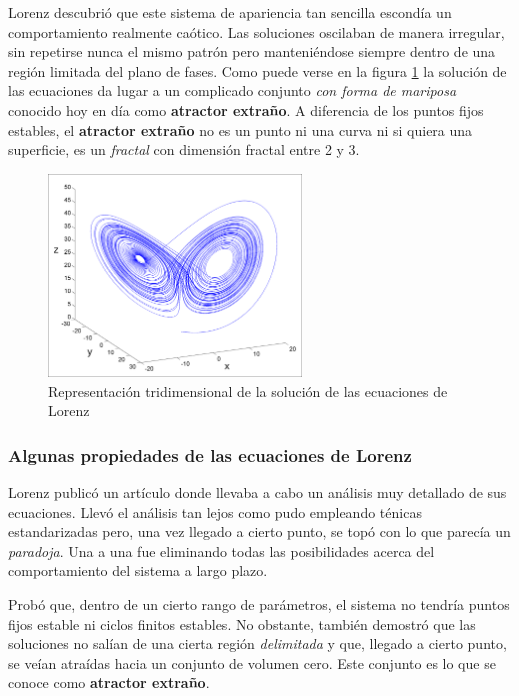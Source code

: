 Lorenz descubrió que este sistema de apariencia tan sencilla escondía un comportamiento realmente caótico. Las soluciones oscilaban de manera irregular, sin repetirse nunca el mismo patrón pero manteniéndose siempre dentro de una región limitada del plano de fases. Como puede verse en la figura \ref{fig:Lorenz} la solución de las ecuaciones da lugar a un complicado conjunto \emph{con forma de mariposa} conocido hoy en día como \textbf{atractor extraño}. A diferencia de los puntos fijos estables, el \textbf{atractor extraño} no es un punto ni una curva ni si quiera una superficie, es un \emph{fractal} con dimensión fractal entre 2 y 3.

\begin{figure}[hbtp]
\centering
\includegraphics[width = 0.6\textwidth]{img/Lorenz.png}
\caption{Representación tridimensional de la solución de las ecuaciones de Lorenz}
\label{fig:Lorenz}
\end{figure}

\subsubsection{Algunas propiedades de las ecuaciones de Lorenz}
Lorenz publicó un artículo donde llevaba a cabo un análisis muy detallado de sus ecuaciones. Llevó el análisis tan lejos como pudo empleando ténicas estandarizadas pero, una vez llegado a cierto punto, se topó con lo que parecía un \emph{paradoja}. Una a una fue eliminando todas las posibilidades acerca del comportamiento del sistema a largo plazo.

Probó que, dentro de un cierto rango de parámetros, el sistema no tendría puntos fijos estable ni ciclos finitos estables. No obstante, también demostró que las soluciones no salían de una cierta región \emph{delimitada} y que, llegado a cierto punto, se veían atraídas hacia un conjunto de volumen cero. Este conjunto es lo que se conoce como \textbf{atractor extraño}.

